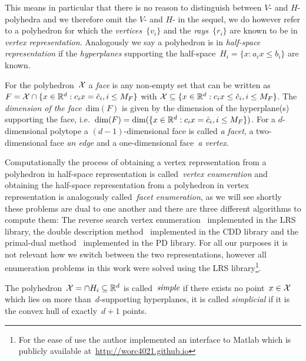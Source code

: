 %
\noindent This means in particular that there is no reason to distinguish between $V$- and $H$-polyhedra and we therefore omit the $V$- and $H$- in the sequel, we do however refer to a polyhedron for which the \emph{vertices}~$\{v_i\}$ and the \emph{rays}~$\{r_i\}$ are known to be in \emph{vertex representation}.
%
Analogously we say a polyhedron is in \emph{half-space representation} if the \emph{hyperplanes} supporting the half-space~$H_i=\{x:a_i x\leq b_i\}$ are known.
%
\begin{defi}
For the polyhedron~$\mathcal X$ a \emph{face} is any non-empty set that can be written as~$F = \mathcal X\cap\{x\in\mathbb R^d: c_i x = \hat c_i, i\leq M_F\}$ with $\mathcal X\subseteq\{x\in\mathbb R^d: c_ix\leq \hat c_i, i\leq M_F\}$.
%
The \emph{dimension of the face}~$\text{dim}(F)$ is given by the dimension of the hyperplane(s) supporting the face, i.e.~$\text{dim}(F)=\text{dim}(\{x\in\mathbb R^d: c_i x = \hat c_i, i\leq M_F\})$.
%
For a $d$-dimensional polytope a $(d-1)$-dimensional face is called \emph{a facet}, a two-dimensional face \emph{an edge} and a one-dimensional face~\emph{a vertex}.
\end{defi}
%
\noindent Computationally the process of obtaining a vertex representation from a polyhedron in half-space representation is called~\emph{vertex enumeration} and obtaining the half-space representation from a polyhedron in vertex representation is analogously called~\emph{facet enumeration}, as we will see shortly these problems are dual to one another and there are three different algorithms to compute them:
%
The reverse search vertex enumeration~\cite{Avis:2000} implemented in the LRS library, the double description method~\cite{Fukuda:1996} implemented in the CDD library and the primal-dual method~\cite{Bremner:1998} implemented in the PD library.
%
For all our purposes it is not relevant how we switch between the two representations, however all enumeration problems in this work were solved using the LRS library\footnote{For the ease of use the author implemented an interface to Matlab which is publicly available at~\href{http://worc4021.github.io}{http://worc4021.github.io}}.
%
\begin{defi}
The polyhedron~$\mathcal X=\cap H_i\subseteq\mathbb R^d$ is called~$\emph{simple}$ if there exists no point~$x\in\mathcal X$ which lies on more than~$d$-supporting hyperplanes, it is called \emph{simplicial} if it is the convex hull of exactly~$d+1$ points.
\end{defi}

